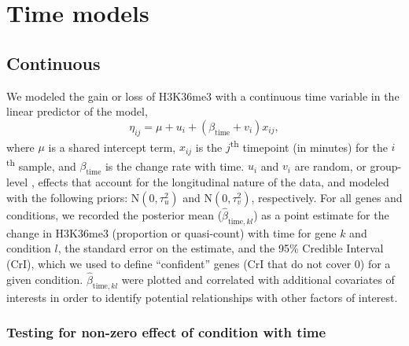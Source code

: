 \documentclass[12pt]{extarticle}
\begin{document}
\section*{Time models}

\subsection*{Continuous}

We modeled the gain or loss of H3K36me3 with a continuous time variable in the linear predictor of the model, 
\begin{equation}
	\eta_{ij} = \mu + u_{i} + (\beta_{\text{time}} + v_{i})x_{ij},
\end{equation}
where $\mu$ is a shared intercept term, $x_{ij}$ is the $j$\textsuperscript{th} timepoint (in minutes) for the $i$\textsuperscript{th} sample, and $\beta_{\text{time}}$ is the change rate with time. $u_{i}$ and $v_{i}$ are random, or group-level \cite{Gelman2006}, effects that account for the longitudinal nature of the data, and modeled with the following priors: $\text{N}(0, \tau^{2}_{u})$ and $\text{N}(0, \tau^{2}_{v})$, respectively. For all genes and conditions, we recorded the posterior mean ($\widehat{\beta}_{\text{time}, kl}$) as a point estimate for the change in H3K36me3 (proportion or quasi-count) with time for gene $k$ and condition $l$, the standard error on the estimate, and the 95\% Credible Interval (CrI), which we used to define ``confident'' genes (CrI that do not cover 0) for a given condition. $\widehat{\beta}_{\text{time}, kl}$ were plotted and correlated with additional covariates of interests in order to identify potential relationships with other factors of interest.

\subsubsection*{Testing for non-zero effect of condition with time}
\end{document}
